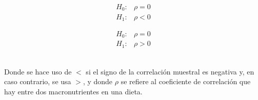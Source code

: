 \documentclass[12pt,a4paper]{article}
\begin{document}
{{            \begin{minipage}{0.5\textwidth}
                \begin{align*}
                    H_0 :& \rho = 0 \\
                    H_1 :& \rho < 0
                \end{align*}
            \end{minipage}%
            \hfill
            \begin{minipage}{0.5\textwidth}
                \begin{align*}
                    H_0 :& \rho = 0 \\
                    H_1 :& \rho > 0
                \end{align*}
            \end{minipage}\\
            \vspace{\baselineskip} 
            Donde se hace uso de $<$ si el signo de la correlación muestral es negativa y, 
            en caso contrario, se usa $>$, y donde $\rho$ se refiere al coeficiente de correlación 
            que hay entre dos macronutrientes en una dieta.\\
            \vspace{\baselineskip} 
}}
\end{document}
